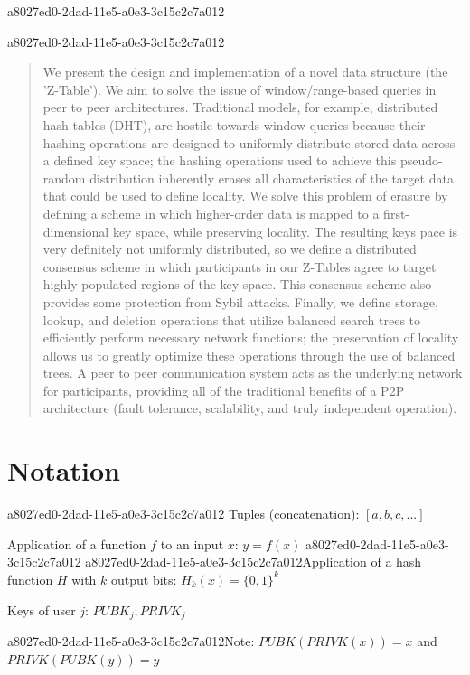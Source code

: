 \documentclass[12pt]{article}
\begin{document}
a8027ed0-2dad-11e5-a0e3-3c15c2c7a012
\maketitle
a8027ed0-2dad-11e5-a0e3-3c15c2c7a012
\begin{abstract}
We present the design and implementation of a novel data structure (the 'Z-Table'). We aim to solve the issue of window/range-based queries in peer to peer architectures. Traditional models, for example,  distributed hash tables (DHT), are hostile towards window queries because their hashing operations are designed to uniformly distribute stored data across a defined key space; the hashing operations used to achieve this pseudo-random distribution inherently erases all characteristics of the target data that could be used to define locality. We solve this problem of erasure by defining a scheme in which higher-order data is mapped to a first-dimensional key space, while preserving locality. The resulting keys pace is very definitely not uniformly distributed, so we define a distributed consensus scheme in which participants in our Z-Tables agree to target highly populated regions of the key space. This consensus scheme also provides some protection from Sybil attacks. Finally, we define storage, lookup, and deletion operations that utilize balanced search trees to efficiently perform necessary network functions; the preservation of locality allows us to greatly optimize these operations through the use of balanced trees. A peer to peer communication system acts as the underlying network for participants, providing all of the traditional benefits of a P2P architecture (fault tolerance, scalability, and truly independent operation).
\end{abstract}

\section{Notation}
a8027ed0-2dad-11e5-a0e3-3c15c2c7a012
Tuples (concatenation): $[a,b,c,...]$

Application of a function $f$ to an input $x$: $y=f(x)$
a8027ed0-2dad-11e5-a0e3-3c15c2c7a012
a8027ed0-2dad-11e5-a0e3-3c15c2c7a012Application of a hash function $H$ with $k$ output bits: $H_{k}(x) = \{0,1\}^k$

Keys of user $j$: $ PUBK_j; PRIVK_j $

a8027ed0-2dad-11e5-a0e3-3c15c2c7a012Note: $PUBK(PRIVK(x)) = x$ and $PRIVK(PUBK(y)) = y$~
\end{document}
